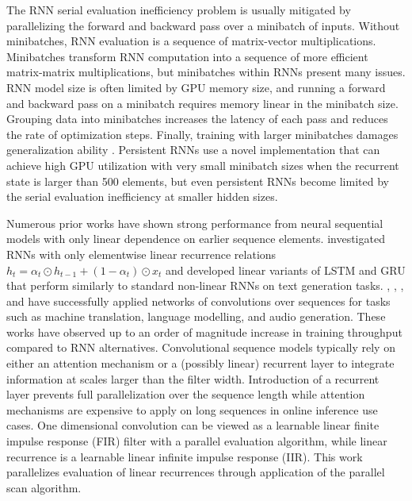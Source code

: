 \documentclass{article}
\begin{document}
The RNN serial evaluation inefficiency problem is usually mitigated by parallelizing the forward
and backward pass over a minibatch of inputs. Without minibatches, RNN evaluation is a sequence of matrix-vector multiplications. Minibatches transform RNN computation into a sequence of more efficient matrix-matrix multiplications, but minibatches within RNNs present many issues.
RNN model size is often limited by GPU memory size, and running a forward 
and backward pass on a minibatch requires memory linear in
the minibatch size.
Grouping data into minibatches increases the latency of each pass and reduces the rate of optimization steps. Finally, training with larger minibatches damages generalization ability 
\cite{keskar2017large}. Persistent RNNs \cite{diamos2016persistent} use a novel implementation that can achieve high GPU utilization with very small 
minibatch sizes when the recurrent state is larger than 500 elements, but even
persistent RNNs become limited by the serial evaluation
inefficiency at smaller hidden sizes.

Numerous prior works have shown strong performance from neural sequential models with only linear dependence on earlier sequence elements. \citet{balduzzi2016strongly} investigated RNNs with only elementwise linear recurrence relations 
$h_t = \alpha_t \odot h_{t-1} + (1-\alpha_t) \odot x_t$ and developed
linear variants of LSTM and GRU that perform similarly to
standard non-linear RNNs on text generation tasks. \citet{bradbury2017quasi},  \citet{kalchbrenner2016neural}, \citet{gehring2017convolutional}, and \citet{van2016wavenet} have successfully applied networks of convolutions over sequences for tasks
such as machine translation, language modelling, and audio generation. 
These works have observed up to an order of magnitude 
increase in training throughput compared to RNN alternatives. Convolutional sequence models typically rely on either an attention mechanism or a (possibly linear) recurrent layer
to integrate information at scales larger than the filter width. Introduction of a recurrent
layer prevents full parallelization over the sequence length while attention mechanisms are
expensive to apply on long sequences in online inference use cases.
One dimensional convolution can be viewed as a learnable linear
finite impulse response (FIR) filter with a parallel evaluation algorithm, while
linear recurrence is a learnable linear infinite impulse response (IIR). This work
parallelizes evaluation of linear recurrences through application of the parallel
scan algorithm.
\end{document}
